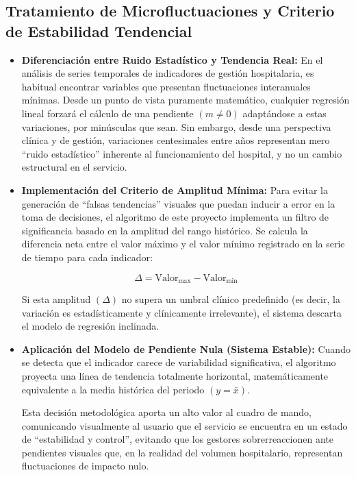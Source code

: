 \subsection{Tratamiento de Microfluctuaciones y Criterio de Estabilidad Tendencial}

\begin{itemize}
    \item \textbf{Diferenciación entre Ruido Estadístico y Tendencia Real:} En el análisis de series temporales de indicadores de gestión hospitalaria, es habitual encontrar variables que presentan fluctuaciones interanuales mínimas. Desde un punto de vista puramente matemático, cualquier regresión lineal forzará el cálculo de una pendiente $(m\neq0)$ adaptándose a estas variaciones, por minúsculas que sean. Sin embargo, desde una perspectiva clínica y de gestión, variaciones centesimales entre años representan mero ``ruido estadístico'' inherente al funcionamiento del hospital, y no un cambio estructural en el servicio.

    \item \textbf{Implementación del Criterio de Amplitud Mínima:} Para evitar la generación de ``falsas tendencias'' visuales que puedan inducir a error en la toma de decisiones, el algoritmo de este proyecto implementa un filtro de significancia basado en la amplitud del rango histórico. Se calcula la diferencia neta entre el valor máximo y el valor mínimo registrado en la serie de tiempo para cada indicador:

    \begin{equation}
    \Delta = \text{Valor}_{\text{max}} - \text{Valor}_{\text{min}}
    \end{equation}

    Si esta amplitud $(\Delta)$ no supera un umbral clínico predefinido (es decir, la variación es estadísticamente y clínicamente irrelevante), el sistema descarta el modelo de regresión inclinada.

    \item \textbf{Aplicación del Modelo de Pendiente Nula (Sistema Estable):} Cuando se detecta que el indicador carece de variabilidad significativa, el algoritmo proyecta una línea de tendencia totalmente horizontal, matemáticamente equivalente a la media histórica del periodo $(y=\bar{x})$.
    
    Esta decisión metodológica aporta un alto valor al cuadro de mando, comunicando visualmente al usuario que el servicio se encuentra en un estado de ``estabilidad y control'', evitando que los gestores sobrerreaccionen ante pendientes visuales que, en la realidad del volumen hospitalario, representan fluctuaciones de impacto nulo.
\end{itemize}

